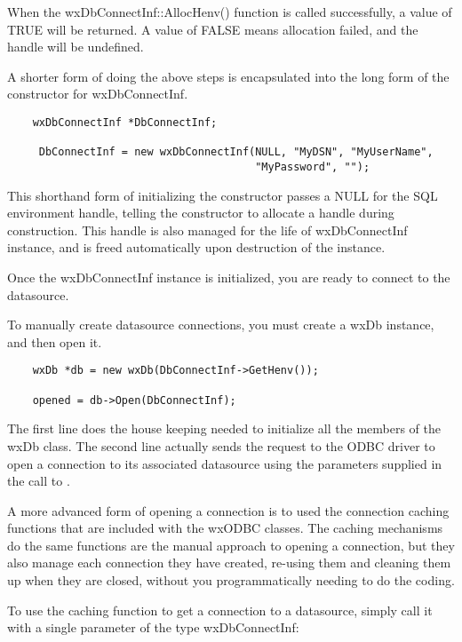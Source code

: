 When the wxDbConnectInf::AllocHenv() function is called successfully, a 
value of TRUE will be returned.  A value of FALSE means allocation failed, 
and the handle will be undefined.

A shorter form of doing the above steps is encapsulated into the 
long form of the constructor for wxDbConnectInf.

\begin{verbatim}
    wxDbConnectInf *DbConnectInf;

	 DbConnectInf = new wxDbConnectInf(NULL, "MyDSN", "MyUserName",
	                                   "MyPassword", "");
\end{verbatim}

This shorthand form of initializing the constructor passes a NULL for the SQL 
environment handle, telling the constructor to allocate a handle during 
construction.  This handle is also managed for the life of wxDbConnectInf 
instance, and is freed automatically upon destruction of the instance.

Once the wxDbConnectInf instance is initialized, you are ready to 
connect to the datasource.

To manually create datasource connections, you must create a wxDb 
instance, and then open it.

\begin{verbatim}
    wxDb *db = new wxDb(DbConnectInf->GetHenv());

    opened = db->Open(DbConnectInf);
\end{verbatim}

The first line does the house keeping needed to initialize all 
the members of the wxDb class.  The second line actually sends the request 
to the ODBC driver to open a connection to its associated datasource using 
the parameters supplied in the call to .

A more advanced form of opening a connection is to used the connection 
caching functions that are included with the wxODBC classes.  The caching 
mechanisms do the same functions are the manual approach to opening a 
connection, but they also manage each connection they have created, 
re-using them and cleaning them up when they are closed, without you 
programmatically needing to do the coding.

To use the caching function  to get 
a connection to a datasource, simply call it with a single parameter of the 
type wxDbConnectInf:

